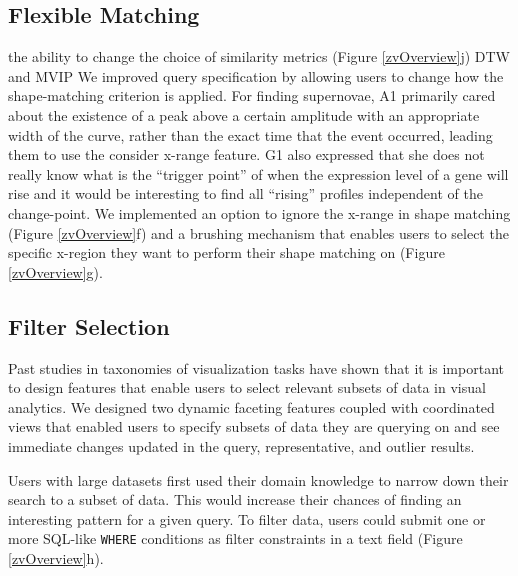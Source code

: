 \subsection{Flexible Matching}
the ability to change the choice of similarity metrics (Figure \ref{zvOverview}j) DTW and MVIP
 We improved query specification by allowing users to change how the shape-matching criterion is applied. For finding supernovae, A1 primarily cared about the existence of a peak above a certain amplitude with an appropriate width of the curve, rather than the exact time that the event occurred, leading them to use the consider x-range feature. G1 also expressed that she does not really know what is the ``trigger point'' of when the expression level of a gene will rise and it would be interesting to find all ``rising'' profiles independent of the change-point.  We implemented an option to ignore the x-range in shape matching (Figure \ref{zvOverview}f) and a brushing mechanism that enables users to select the specific x-region they want to perform their shape matching on (Figure \ref{zvOverview}g).

\subsection{Filter Selection}
\par Past studies in taxonomies of visualization tasks have shown that it is important to design features that enable users to select relevant subsets of data in visual analytics\cite{Amar2005,Heer2012}. We designed two dynamic faceting features coupled with coordinated views that enabled users to specify subsets of data they are querying on and see immediate changes updated in the query, representative, and outlier results.

 Users with large datasets first used their domain knowledge to narrow down their search to a subset of data. This would increase their chances of finding an interesting pattern for a given query. To filter data, users could submit one or more SQL-like \texttt{WHERE} conditions as filter constraints in a text field (Figure \ref{zvOverview}h). 
